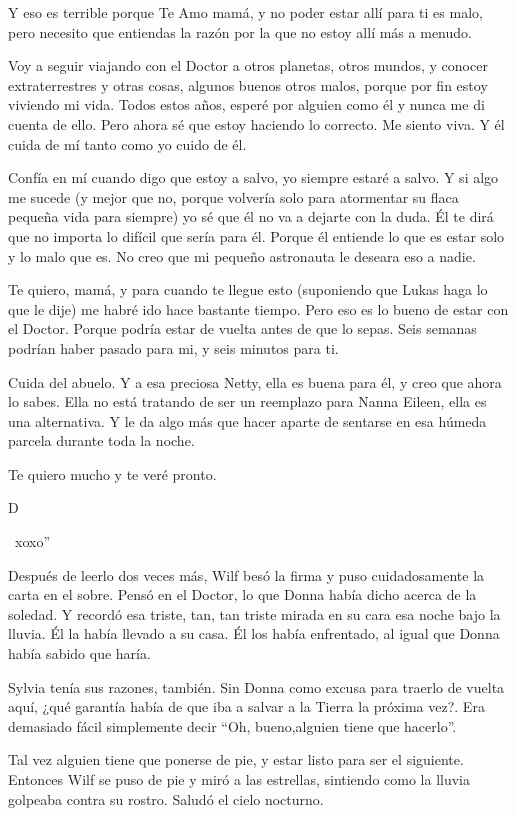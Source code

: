 Y eso es terrible porque Te Amo mamá, y no poder estar allí para ti es
malo, pero necesito que entiendas la razón por la que no estoy allí más
a menudo.

Voy a seguir viajando con el Doctor a otros planetas, otros mundos, y
conocer extraterrestres y otras cosas, algunos buenos otros malos,
porque por fin estoy viviendo mi vida. Todos estos años, esperé por
alguien como él y nunca me di cuenta de ello. Pero ahora sé que estoy
haciendo lo correcto. Me siento viva. Y él cuida de mí tanto como yo
cuido de él.

Confía en mí cuando digo que estoy a salvo, yo siempre estaré a salvo. Y
si algo me sucede (y mejor que no, porque volvería solo para atormentar
su flaca pequeña vida para siempre) yo sé que él no va a dejarte con la
duda. Él te dirá que no importa lo difícil que sería para él. Porque él
entiende lo que es estar solo y lo malo que es. No creo que mi pequeño
astronauta le deseara eso a nadie.

Te quiero, mamá, y para cuando te llegue esto (suponiendo que Lukas haga
lo que le dije) me habré ido hace bastante tiempo. Pero eso es lo bueno
de estar con el Doctor. Porque podría estar de vuelta antes de que lo
sepas. Seis semanas podrían haber pasado para mi, y seis minutos para
ti.

Cuida del abuelo. Y a esa preciosa Netty, ella es buena para él, y creo
que ahora lo sabes. Ella no está tratando de ser un reemplazo para Nanna
Eileen, ella es una alternativa. Y le da algo más que hacer aparte de
sentarse en esa húmeda parcela durante toda la noche.

Te quiero mucho y te veré pronto.

D

~xoxo''

Después de leerlo dos veces más, Wilf besó la firma y puso
cuidadosamente la carta en el sobre. Pensó en el Doctor, lo que Donna
había dicho acerca de la soledad. Y recordó esa triste, tan, tan triste
mirada en su cara esa noche bajo la lluvia. Él la había llevado a su
casa. Él los había enfrentado, al igual que Donna había sabido que
haría.

Sylvia tenía sus razones, también. Sin Donna como excusa para traerlo de
vuelta aquí, ¿qué garantía había de que iba a salvar a la Tierra la
próxima vez?. Era demasiado fácil simplemente decir ``Oh, bueno,alguien
tiene que hacerlo''.

Tal vez alguien tiene que ponerse de pie, y estar listo para ser el
siguiente. Entonces Wilf se puso de pie y miró a las estrellas,
sintiendo como la lluvia golpeaba contra su rostro. Saludó el cielo
nocturno.

